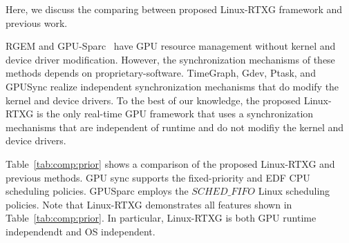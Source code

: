 \label{sec:relatedwork}
Here, we discuss the comparing between proposed Linux-RTXG framework and previous work.

\begin{table*}[t]
\begin{center}
\caption{Linux-RTXG vs Prior Work}
\label{tab:comp:prior}
\ifthesis
{}
\fi
\end{center}
\end{table*}

RGEM and GPU-Sparc~\cite{sparc} have GPU resource management without kernel and device driver modification.
However, the synchronization mechanisms of these methods depends on proprietary-software.
TimeGraph, Gdev, Ptask, and GPUSync realize independent synchronization mechanisms that do modify the kernel and device drivers.
To the best of our knowledge, the proposed Linux-RTXG is the only real-time GPU framework that uses a synchronization mechanisms
that are independent of runtime and do not modifiy the kernel and device drivers.

Table~\ref{tab:comp:prior} shows a comparison of the proposed Linux-RTXG and previous methods.
GPU sync supports the fixed-priority and EDF CPU scheduling policies.
GPUSparc employs the $SCHED\_FIFO$ Linux scheduling policies.
Note that Linux-RTXG demonstrates all features shown in Table~\ref{tab:comp:prior}.
In particular, Linux-RTXG is both GPU runtime independendt and OS independent.

